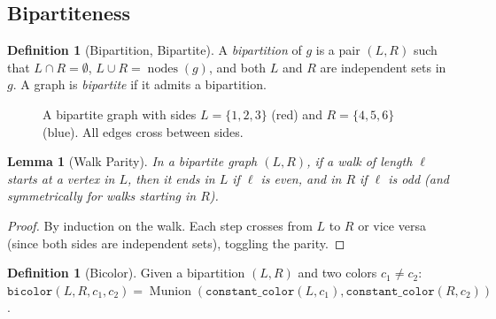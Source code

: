 \documentclass[11pt]{article}
\theoremstyle{plain}
\newtheorem{lemma}[theorem]{Lemma}
\theoremstyle{definition}
\newtheorem{definition}[theorem]{Definition}
\theoremstyle{remark}
\newcommand{\nodes}{\operatorname{nodes}}
\newcommand{\Munion}{\operatorname{Munion}}
\begin{document}
\subsection{Bipartiteness}

\begin{definition}[Bipartition, Bipartite]
A \emph{bipartition} of $g$ is a pair $(L, R)$ such that $L \cap R = \emptyset$, $L \cup R = \nodes(g)$, and both $L$ and $R$ are independent sets in $g$. A graph is \emph{bipartite} if it admits a bipartition.
\end{definition}

\begin{figure}[ht]
\centering
{}
\caption{A bipartite graph with sides $L = \{1,2,3\}$ (red) and $R = \{4,5,6\}$ (blue). All edges cross between sides.}
\label{fig:bipartite}
\end{figure}

\begin{lemma}[Walk Parity]
\label{lem:walk-parity}
In a bipartite graph $(L, R)$, if a walk of length $\ell$ starts at a vertex in $L$, then it ends in $L$ if $\ell$ is even, and in $R$ if $\ell$ is odd (and symmetrically for walks starting in $R$).
\end{lemma}

\begin{proof}
By induction on the walk. Each step crosses from $L$ to $R$ or vice versa (since both sides are independent sets), toggling the parity.
\end{proof}

\begin{definition}[Bicolor]
Given a bipartition $(L, R)$ and two colors $c_1 \neq c_2$:
$\texttt{bicolor}(L, R, c_1, c_2) = \Munion(\texttt{constant\_color}(L, c_1), \texttt{constant\_color}(R, c_2))$.
\end{definition}
\end{document}
